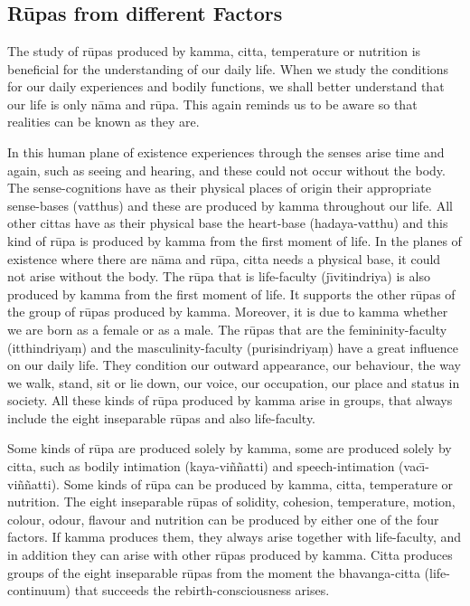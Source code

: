 \documentclass{book}
\begin{document}
\chapter[R\=upas from different Factors]{}
\section*{R\=upas from different Factors}
The study of r\=upas produced by kamma, citta, temperature or nutrition
is beneficial for the understanding of our daily life. When we study
the conditions for our daily experiences and bodily functions, we shall
better understand that our life is only n{\=a}ma and r\=upa. This again
reminds us to be aware so that realities can be known as they are. 

In this human plane of existence experiences through the senses arise
time and again, such as seeing and hearing, and these could not occur
without the body. The sense-cognitions have as their physical places
of origin their appropriate sense-bases (vatthus) and these are
produced by kamma throughout our life. All other cittas have as their
physical base the heart-base (hadaya-vatthu) and this kind of
r\=upa is produced by kamma from the first moment of life. In the
planes of existence where there are n{\=a}ma and r\=upa, citta needs a
physical base, it could not arise without the body. The r\=upa that is
life-faculty (j\=\i vitindriya) is also produced by kamma from the
first moment of life. It supports the other r\=upas of the group of
r\=upas produced by kamma. Moreover, it is due to kamma whether we are
born as a female or as a male. The r\=upas that are the
femininity-faculty (itthindriya\d m) and the masculinity-faculty
(purisindriya\d m) have a great influence on our daily life. They
condition our outward appearance, our behaviour, the way we walk,
stand, sit or lie down, our voice, our occupation, our place and status
in society. All these kinds of r\=upa produced by kamma arise in
groups, that always include the eight inseparable r\=upas and also
life-faculty. 

Some kinds of r\=upa are produced solely by kamma, some are produced
solely by citta, such as bodily intimation (kaya-vi\~n\~natti) and
speech-intimation (vac\=\i{}-vi\~n\~natti). Some kinds of r\=upa can
be produced by kamma, citta, temperature or nutrition. The eight
inseparable r\=upas of solidity, cohesion, temperature, motion, colour,
odour, flavour and nutrition can be produced by either one of the four
factors. If kamma produces them, they always arise together with
life-faculty, and in addition they can arise with other r\=upas
produced by kamma. Citta produces groups of the eight inseparable
r\=upas from the moment the bhavanga-citta (life-continuum) that
succeeds the rebirth-consciousness arises. 
\end{document}
